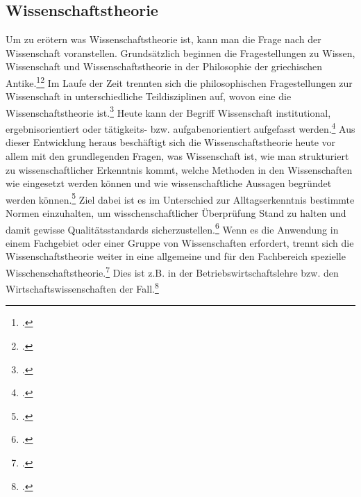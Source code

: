 \documentclass[a4paper,12pt]{article}
\begin{document}
\subsection{Wissenschaftstheorie}
Um zu erötern was Wissenschaftstheorie ist, kann man die Frage nach der Wissenschaft voranstellen. Grundsätzlich beginnen die Fragestellungen zu Wissen, Wissenschaft und Wissenschaftstheorie in der Philosophie der griechischen Antike.\footcite[S. 3]{Kornmesser2020}\footcite[S. 686]{Reicher2023} Im Laufe der Zeit trennten sich die philosophischen Fragestellungen zur Wissenschaft in unterschiedliche Teildisziplinen auf, wovon eine die Wissenschaftstheorie ist.\footcite[S. 4]{Kornmesser2020} Heute kann der Begriff Wissenschaft institutional, ergebnisorientiert oder tätigkeits- bzw. aufgabenorientiert aufgefasst werden.\footcite[S. 4]{Kornmeier2007} Aus dieser Entwicklung heraus beschäftigt sich die Wissenschaftstheorie heute vor allem mit den grundlegenden Fragen, was Wissenschaft ist, wie man strukturiert zu wissenschaftlicher Erkenntnis kommt, welche Methoden in den Wissenschaften wie eingesetzt werden können und wie wissenschaftliche Aussagen begründet werden können.\footcite[S. 5]{Kornmesser2020} Ziel dabei ist es im Unterschied zur Alltagserkenntnis bestimmte Normen einzuhalten, um wisschenschaftlicher Überprüfung Stand zu halten und damit gewisse Qualitätsstandards sicherzustellen.\footcite[S. 9]{Helfrich2024} Wenn es die Anwendung in einem Fachgebiet oder einer Gruppe von Wissenschaften erfordert, trennt sich die Wissenschaftstheorie weiter in eine allgemeine und für den Fachbereich spezielle Wisschenschaftstheorie.\footcite[S. 5]{Kornmesser2020} Dies ist z.B. in der Betriebswirtschaftslehre bzw. den Wirtschaftswissenschaften der Fall.\footcite[S. 25]{Helfrich2024}
\end{document}
